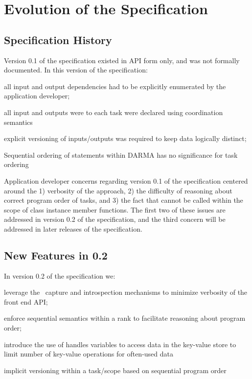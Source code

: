 
\chapter{Evolution of the Specification}
\label{chap:evolution}
\section{Specification History}
\label{sec:past}
Version 0.1 of the specification existed in \gls{API} form only, and was not
formally documented.  In this version of the specification:
\begin{compactenum}
\item all input and output dependencies had to be explicitly enumerated by the application
developer;
\item all input and outputs were to each task were declared using \gls{coordination semantics}
\item explicit versioning of inputs/outputs was required to keep data
logically distinct;
\item Sequential ordering of statements within DARMA has no significance for task ordering
\end{compactenum}

 Application developer concerns regarding version 0.1 of the specification
 centered around the 1) verbosity of the approach, 2) the difficulty of
 reasoning about correct program order of tasks, and 3) the fact that 
  cannot be called
 within the scope of class instance member functions.  The first two of these issues are
   addressed in version 0.2 of the specification, and the third concern will be
   addressed in later releases of the specification.
   


\section{New Features in 0.2}
\label{sec:current}
In version 0.2 of the specification we:
  \begin{compactenum}
\item leverage the \CC\ \gls{capture} and
    \gls{introspection} mechanisms to minimize verbosity of the \gls{front end}
    \gls{API};  
\item enforce \gls{sequential semantics} within a \gls{rank} to
    facilitate reasoning about program order; 
\item introduce the use of
    \glspl{handle} variables to access data in the \gls{key-value store} to limit number of key-value operations for often-used data
\item implicit versioning within a task/scope based on sequential program order    
    \end{compactenum}


